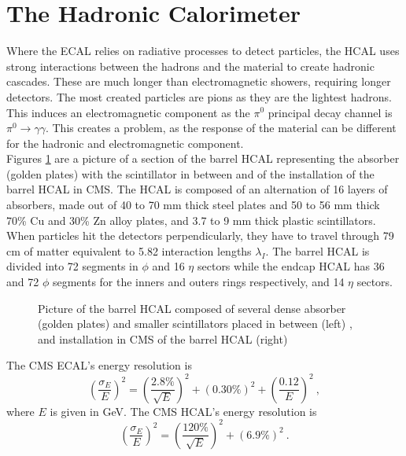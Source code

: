   \section{The Hadronic Calorimeter}

  Where the ECAL relies on radiative processes to detect particles, the HCAL uses strong interactions between the hadrons and the material to create hadronic cascades. These are much longer than electromagnetic showers, requiring longer detectors. The most created particles are pions as they are the lightest hadrons. This induces an electromagnetic component as the $ \pi^0 $ principal decay channel is $ \pi^0 \rightarrow \gamma \gamma $. This creates a problem, as the response of the material can be different for the hadronic and electromagnetic component. \\

  Figures \ref{fig:lhc_and_cms__cms_hcal_view} are a picture of a section of the barrel HCAL representing the absorber (golden plates) with the scintillator in between and of the installation of the barrel HCAL in CMS. The HCAL is composed of an alternation of 16 layers of absorbers, made out of 40 to 70 mm thick steel plates and 50 to 56 mm thick 70\% Cu and 30\% Zn alloy plates, and 3.7 to 9 mm thick plastic scintillators. When particles hit the detectors perpendicularly, they have to travel through 79 cm of matter equivalent to 5.82 interaction lengths $ \lambda_I $. The barrel HCAL is divided into 72 segments in $ \phi $ and 16 $ \eta $ sectors while the endcap HCAL has 36 and 72 $ \phi $ segments for the inners and outers rings respectively, and 14 $ \eta $ sectors.

  \begin{figure}[h!]
    \centering
    \caption{Picture of the barrel HCAL composed of several dense absorber (golden plates) and smaller scintillators placed in between (left) \Cite{CMS_at_LHC}, and installation in CMS of the barrel HCAL (right) \Cite{CMS_HCAL_Install}}
    \label{fig:lhc_and_cms__cms_hcal_view}
  \end{figure}

  The CMS ECAL's energy resolution is \Cite{CMS_Performances}
  \begin{equation}
    \left( \frac{\sigma_E}{E} \right)^2 = \left( \frac{2.8\%}{\sqrt{E}} \right)^2 + \left( 0.30\% \right)^2 + \left( \frac{0.12}{E} \right)^2 \ ,
  \end{equation}
  where $ E $ is given in GeV. The CMS HCAL's energy resolution is
  \begin{equation}
    \left( \frac{\sigma_E}{E} \right)^2 = \left( \frac{120\%}{\sqrt{E}} \right)^2 + \left( 6.9\% \right)^2 \ .
  \end{equation}


